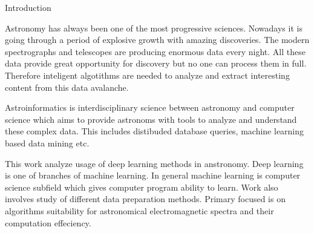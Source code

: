 \chap Introduction

Astronomy has always been one of the most progressive sciences. Nowadays it is
going through a period of explosive growth with amazing discoveries. The modern
spectrographs and telescopes are producing enormous data every night. All these
data provide great opportunity for discovery but no one can process them
in full. Therefore inteligent algotithms are needed to analyze and extract
interesting content from this data avalanche.

Astroinformatics is interdisciplinary science between astronomy and
computer science which aims to provide astronoms with tools to analyze and
understand these complex data. This includes distibuded database queries,
machine learning based data mining etc.

This work analyze usage of deep learning methods in anstronomy.
Deep learning is one of branches of machine learning. In general machine
learning is computer science subfield which gives computer program ability to
learn. Work also involves study of different data preparation methods.
Primary focused is on algorithms suitability for astronomical electromagnetic
spectra and their computation effeciency.
